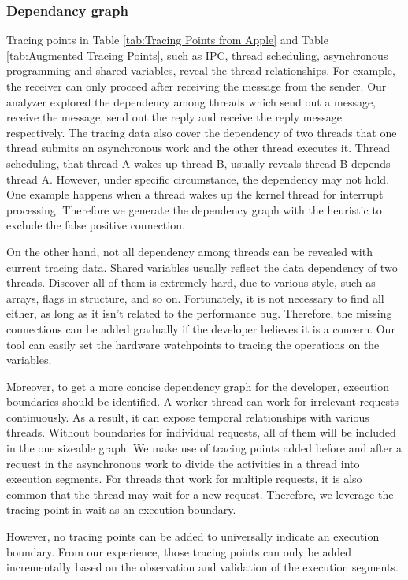 \subsubsection{Dependancy graph}
Tracing points in Table \ref{tab:Tracing Points from Apple} and Table \ref{tab:Augmented Tracing Points},
such as IPC, thread scheduling, asynchronous programming and shared variables, reveal the thread relationships.
For example, the receiver can only proceed after receiving the message from the sender. 
Our analyzer explored the dependency among threads which send out a message, receive the message, send out the reply and receive the reply message respectively.
The tracing data also cover the dependency of two threads that one thread submits an asynchronous work and the other thread executes it.
Thread scheduling, that thread A wakes up thread B, usually reveals thread B depends thread A.
However, under specific circumstance, the dependency may not hold.
One example happens when a thread wakes up the kernel thread for interrupt processing. 
Therefore we generate the dependency graph with the heuristic to exclude the false positive connection.
\par
On the other hand, not all dependency among threads can be revealed with current tracing data.
Shared variables usually reflect the data dependency of two threads.
Discover all of them is extremely hard, due to various style, such as arrays, flags in structure, and so on.
Fortunately, it is not necessary to find all either, as long as it isn't related to the performance bug.
Therefore, the missing connections can be added gradually if the developer believes it is a concern.
Our tool can easily set the hardware watchpoints to tracing the operations on the variables.
\par
Moreover, to get a more concise dependency graph for the developer, execution boundaries should be identified.
A worker thread can work for irrelevant requests continuously.
As a result, it can expose temporal relationships with various threads.
Without boundaries for individual requests, all of them will be included in the one sizeable graph.
We make use of tracing points added before and after a request in the asynchronous work to divide the activities in a thread into execution segments.
For threads that work for multiple requests, it is also common that the thread may wait for a new request.
Therefore, we leverage the tracing point in wait as an execution boundary.
\par
However, no tracing points can be added to universally indicate an execution boundary.
From our experience, those tracing points can only be added incrementally based on the observation and validation of the execution segments.\par
